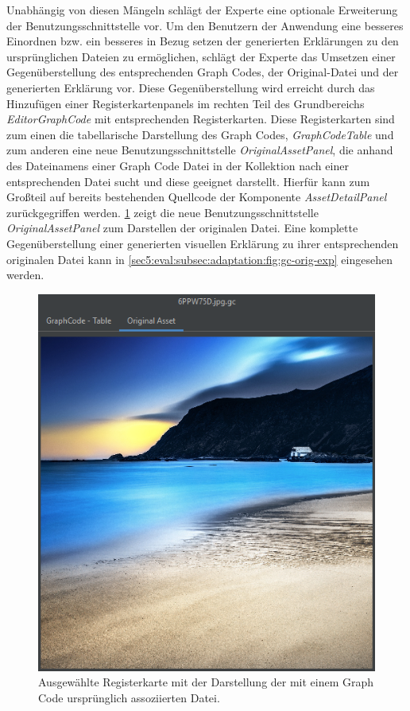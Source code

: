 Unabhängig von diesen Mängeln schlägt der Experte eine optionale Erweiterung der Benutzungsschnittstelle vor.
Um den Benutzern der Anwendung eine besseres Einordnen bzw. ein besseres in Bezug setzen der generierten Erklärungen zu den ursprünglichen Dateien zu ermöglichen, schlägt der Experte das Umsetzen einer Gegenüberstellung des entsprechenden Graph Codes, der Original-Datei und der generierten Erklärung vor.
Diese Gegenüberstellung wird erreicht durch das Hinzufügen einer Registerkartenpanels im rechten Teil des Grundbereichs \textit{EditorGraphCode} mit entsprechenden Registerkarten.
Diese Registerkarten sind zum einen die tabellarische Darstellung des Graph Codes, \textit{GraphCodeTable} und zum anderen eine neue Benutzungsschnittstelle \textit{OriginalAssetPanel}, die anhand des Dateinamens einer Graph Code Datei in der Kollektion nach einer entsprechenden Datei sucht und diese geeignet darstellt.
Hierfür kann zum Großteil auf bereits bestehenden Quellcode der Komponente \textit{AssetDetailPanel} zurückgegriffen werden.
\cref{sec5:eval:subsec:adaptation:fig:original-asset} zeigt die neue Benutzungsschnittstelle \textit{OriginalAssetPanel} zum Darstellen der originalen Datei.
Eine komplette Gegenüberstellung einer generierten visuellen Erklärung zu ihrer entsprechenden originalen Datei kann in \cref{sec5:eval:subsec:adaptation:fig:gc-orig-exp} eingesehen werden.

\begin{figure}[!ht]
  \includegraphics{chapter/chapter_5/original-asset}
  \caption{Ausgewählte Registerkarte mit der Darstellung der mit einem Graph Code ursprünglich assoziierten Datei.}
  \label{sec5:eval:subsec:adaptation:fig:original-asset}
\end{figure}

